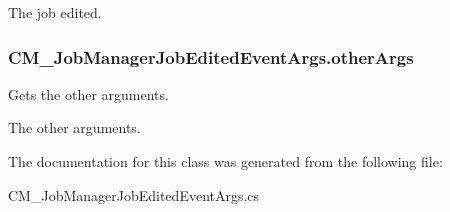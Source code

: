 The job edited.\hypertarget{class_c_m___job_manager_job_edited_event_args_a5baf47bf8ecddf8a6f88b0779a504670}{}
\subsubsection[{other\+Args}]{ C\+M\+\_\+\+Job\+Manager\+Job\+Edited\+Event\+Args.\+other\+Args\hspace{0.3cm}{\ttfamily [get]}}\label{class_c_m___job_manager_job_edited_event_args_a5baf47bf8ecddf8a6f88b0779a504670}


Gets the other arguments. 

The other arguments.

The documentation for this class was generated from the following file\+:\begin{DoxyCompactItemize}
\item 
C\+M\+\_\+\+Job\+Manager\+Job\+Edited\+Event\+Args.\+cs\end{DoxyCompactItemize}
